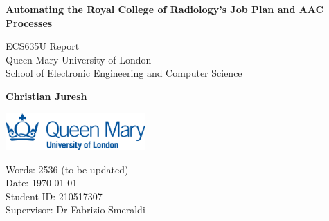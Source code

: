 \begin{titlepage}
    \begin{center}
        
        \vspace*{1cm}
            
        \Huge
        \textbf{Automating the Royal College of Radiology’s Job Plan and AAC Processes}
            
        \vspace{1cm}

        \LARGE
        ECS635U Report \\
        Queen Mary University of London \\
        School of Electronic Engineering and Computer Science
            
        \vspace{1.5cm}
            
        \textbf{Christian Juresh}
            
        \vfill
            
    \begin{flushleft}       
        \includegraphics[width=0.4\textwidth]{images/qmul-logo.jpg}  

        \vspace{0.8cm}
 
        \Large
        Words: 2536 (to be updated) \\
        Date: \today \\
        Student ID: 210517307\\
        Supervisor: Dr Fabrizio Smeraldi\\
    \end{flushleft}
    \end{center}
\end{titlepage}